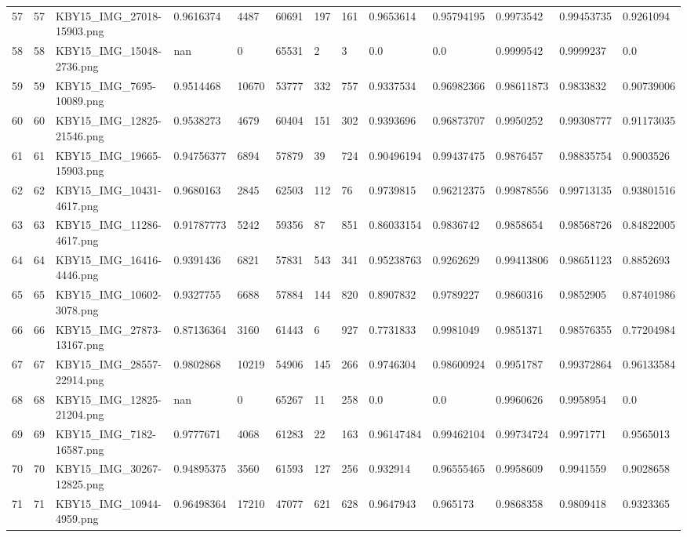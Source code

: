 \documentclass[11pt, a4paper, twoside]{report}
\begin{document}
\begin{longtable}[c]{@{}lllllllllllll@{}}
57 & 57 & KBY15\_IMG\_27018-15903.png & 0.9616374 & 4487 & 60691 & 197 & 161 & 0.9653614 & 0.95794195 & 0.9973542 & 0.99453735 & 0.9261094 \\
58 & 58 & KBY15\_IMG\_15048-2736.png & nan & 0 & 65531 & 2 & 3 & 0.0 & 0.0 & 0.9999542 & 0.9999237 & 0.0 \\
59 & 59 & KBY15\_IMG\_7695-10089.png & 0.9514468 & 10670 & 53777 & 332 & 757 & 0.9337534 & 0.96982366 & 0.98611873 & 0.9833832 & 0.90739006 \\
60 & 60 & KBY15\_IMG\_12825-21546.png & 0.9538273 & 4679 & 60404 & 151 & 302 & 0.9393696 & 0.96873707 & 0.9950252 & 0.99308777 & 0.91173035 \\
61 & 61 & KBY15\_IMG\_19665-15903.png & 0.94756377 & 6894 & 57879 & 39 & 724 & 0.90496194 & 0.99437475 & 0.9876457 & 0.98835754 & 0.9003526 \\
62 & 62 & KBY15\_IMG\_10431-4617.png & 0.9680163 & 2845 & 62503 & 112 & 76 & 0.9739815 & 0.96212375 & 0.99878556 & 0.99713135 & 0.93801516 \\
63 & 63 & KBY15\_IMG\_11286-4617.png & 0.91787773 & 5242 & 59356 & 87 & 851 & 0.86033154 & 0.9836742 & 0.9858654 & 0.98568726 & 0.84822005 \\
64 & 64 & KBY15\_IMG\_16416-4446.png & 0.9391436 & 6821 & 57831 & 543 & 341 & 0.95238763 & 0.9262629 & 0.99413806 & 0.98651123 & 0.8852693 \\
65 & 65 & KBY15\_IMG\_10602-3078.png & 0.9327755 & 6688 & 57884 & 144 & 820 & 0.8907832 & 0.9789227 & 0.9860316 & 0.9852905 & 0.87401986 \\
66 & 66 & KBY15\_IMG\_27873-13167.png & 0.87136364 & 3160 & 61443 & 6 & 927 & 0.7731833 & 0.9981049 & 0.9851371 & 0.98576355 & 0.77204984 \\
67 & 67 & KBY15\_IMG\_28557-22914.png & 0.9802868 & 10219 & 54906 & 145 & 266 & 0.9746304 & 0.98600924 & 0.9951787 & 0.99372864 & 0.96133584 \\
68 & 68 & KBY15\_IMG\_12825-21204.png & nan & 0 & 65267 & 11 & 258 & 0.0 & 0.0 & 0.9960626 & 0.9958954 & 0.0 \\
69 & 69 & KBY15\_IMG\_7182-16587.png & 0.9777671 & 4068 & 61283 & 22 & 163 & 0.96147484 & 0.99462104 & 0.99734724 & 0.9971771 & 0.9565013 \\
70 & 70 & KBY15\_IMG\_30267-12825.png & 0.94895375 & 3560 & 61593 & 127 & 256 & 0.932914 & 0.96555465 & 0.9958609 & 0.9941559 & 0.9028658 \\
71 & 71 & KBY15\_IMG\_10944-4959.png & 0.96498364 & 17210 & 47077 & 621 & 628 & 0.9647943 & 0.965173 & 0.9868358 & 0.9809418 & 0.9323365 \\

\end{longtable}
\end{document}
